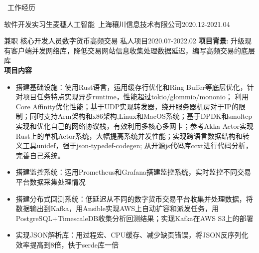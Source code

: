 \documentclass[UTF8]{resume}
\begin{document}
\begin{rSection}{\faBriefcase~工作经历}
\begin{rExperience}{软件开发实习生}{麦穗人工智能~上海穰川信息技术有限公司}{2020.12-2021.04}
\begin{itemize}
        \end{itemize}
    \end{rExperience}
    \begin{rExperience}{兼职 核心开发人员}{数字货币高频交易 私人项目}{2020.07-2022.02}
        \textbf{项目背景}:
        升级现有客户端并发网络库，降低交易网站信息收集处理数据延迟，编写高频交易的底层库\\
        \textbf{项目内容}
        \begin{itemize}
            \itemsep -0.5em \vspace{-0.5em}
            \item 搭建基础设施：使用Rust语言，运用缓存行优化和Ring Buffer等底层优化，针对项目任务特点实现异步runtime，性能超过tokio/glommio/mononio； 利用Core Affinity优化性能；基于UDP实现转发器，绕开服务器机房对于IP的限制；同时支持Arm架构和x86架构,Linux和MacOS系统；基于DPDK和smoltcp实现和优化自己的网络协议栈，有效利用多核心多网卡；参考Akka Actor实现Rust上的单机Actor系统，大幅提高系统并发性能；实现跨语言数据结构和转义工具unidef，强于json-typedef-codegen; 从开源js代码库ccxt进行代码分析，完善自己系统。
            \item 搭建监控系统：运用Prometheus和Grafana搭建监控系统，实时监控不同交易平台数据采集处理情况
            \item 搭建分布式回测系统：低延迟从不同的数字货币交易平台收集并处理数据，将数据输出到Kafka，用Ansible实现AWS上自动扩容和派发任务，用PostgreSQL+TimescaleDB收集分析回测结果；实现Kafka在AWS S3上的部署
            \item 实现JSON解析库：用过程宏、CPU缓存、减少缺页错误，将JSON反序列化效率提高到8倍，快于serde库一倍 
        \end{itemize}
    \end{rExperience}
\end{rSection}
\end{document}
